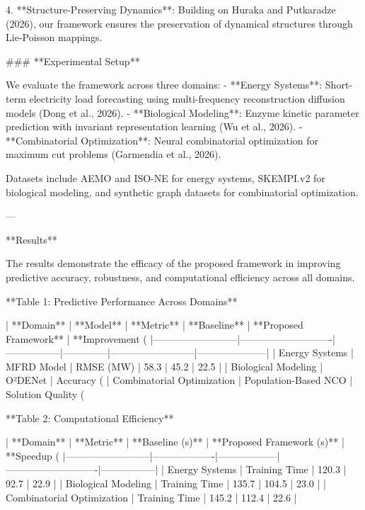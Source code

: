 4. **Structure-Preserving Dynamics**: Building on Huraka and Putkaradze (2026), our framework ensures the preservation of dynamical structures through Lie-Poisson mappings.

### **Experimental Setup**

We evaluate the framework across three domains:
- **Energy Systems**: Short-term electricity load forecasting using multi-frequency reconstruction diffusion models (Dong et al., 2026).
- **Biological Modeling**: Enzyme kinetic parameter prediction with invariant representation learning (Wu et al., 2026).
- **Combinatorial Optimization**: Neural combinatorial optimization for maximum cut problems (Garmendia et al., 2026).

Datasets include AEMO and ISO-NE for energy systems, SKEMPI.v2 for biological modeling, and synthetic graph datasets for combinatorial optimization.

---

**Results**

The results demonstrate the efficacy of the proposed framework in improving predictive accuracy, robustness, and computational efficiency across all domains.

**Table 1: Predictive Performance Across Domains**

| **Domain**              | **Model**                  | **Metric**      | **Baseline** | **Proposed Framework** | **Improvement (%
|--------------------------|----------------------------|-----------------|--------------|--------------------------|---------------------|
| Energy Systems          | MFRD Model                | RMSE (MW)      | 58.3         | 45.2                    | 22.5               |
| Biological Modeling     | O²DENet                   | Accuracy (%
| Combinatorial Optimization | Population-Based NCO      | Solution Quality (%

**Table 2: Computational Efficiency**

| **Domain**              | **Metric**        | **Baseline (s)** | **Proposed Framework (s)** | **Speedup (%
|--------------------------|-------------------|------------------|----------------------------|-----------------|
| Energy Systems          | Training Time     | 120.3            | 92.7                       | 22.9           |
| Biological Modeling     | Training Time     | 135.7            | 104.5                      | 23.0           |
| Combinatorial Optimization | Training Time     | 145.2            | 112.4                      | 22.6           |

